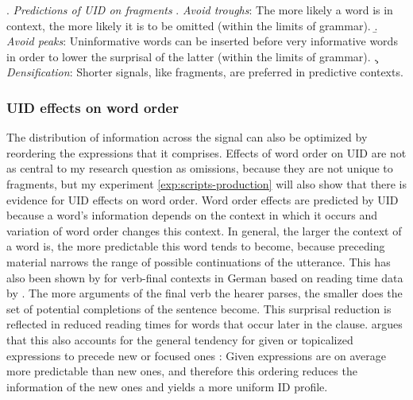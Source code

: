 \ex. \textit{Predictions of UID on fragments} \label{ex:uid-fragments-predictions}
\a. \textit{Avoid troughs}: The more likely a word is in context, the more likely it is to be omitted (within the limits of grammar).\label{ex:uid-fragments-predictions-troughs}
 \b. \textit{Avoid peaks}: Uninformative words can be inserted before very informative words in order to lower the surprisal of the latter (within the limits of grammar).\label{ex:uid-fragments-predictions-peaks}
 \c. \textit{Densification}: Shorter signals, like fragments, are preferred in predictive contexts.\label{ex:uid-fragments-predictions-densification}

\subsubsection{UID effects on word order}
The distribution of information across the signal can also be optimized by reordering the expressions that it comprises. Effects of word order on UID are not as central to my research question as omissions, because they are not unique to fragments, but my experiment \ref{exp:scripts-production} will also show that there is evidence for UID effects on word order. Word order effects are predicted by UID because a word's information depends on the context in which it occurs and variation of word order changes this context. In general, the larger the context of a word is, the more predictable this word tends to become, because preceding material narrows the range of possible continuations of the utterance. This has also been shown by \citet{levy2008} for verb-final contexts in German based on reading time data by \citet{konieczny.doring2003}. The more arguments of the final verb the hearer parses, the smaller does the set of potential completions of the sentence become. This surprisal reduction is reflected in reduced reading times for words that occur later in the clause. \citet{fenk-oczlon1983} argues that this also accounts for the general tendency for given or topicalized expressions to precede new or focused ones \citep{chafe1976}: Given expressions are on average more predictable than new ones, and therefore this ordering reduces the information of the new ones and yields a more uniform ID profile.%
